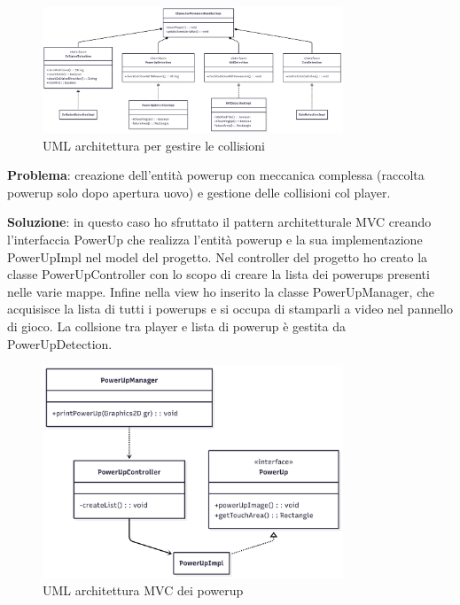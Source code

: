\documentclass[a4paper,12pt]{report}
\begin{document}
\begin{figure}[H]
    \centering
    \includegraphics[width=0.8\textwidth]{resources/Collisions.png}
    \caption{UML architettura per gestire le collisioni}
    \label{fig:2.3}
\end{figure}

\textbf{Problema}: creazione dell'entità powerup con meccanica complessa (raccolta powerup solo dopo apertura uovo) e gestione 
delle collisioni col player.\vspace{1cm}

\textbf{Soluzione}: in questo caso ho sfruttato il pattern architetturale MVC creando l'interfaccia PowerUp che realizza l'entità powerup 
e la sua implementazione PowerUpImpl nel model del progetto. Nel controller del progetto ho creato la classe PowerUpController 
con lo scopo di creare la lista dei powerups presenti nelle varie mappe. Infine nella view ho inserito la classe PowerUpManager, 
che acquisisce la lista di tutti i powerups e si occupa di stamparli a video nel pannello di gioco. La collsione tra player e lista 
di powerup è gestita da PowerUpDetection.

\begin{figure}[H]
    \centering
    \includegraphics[width=0.8\textwidth]{resources/Powerup.png}
    \caption{UML architettura MVC dei powerup}
    \label{fig:2.4}
\end{figure}
\end{document}
